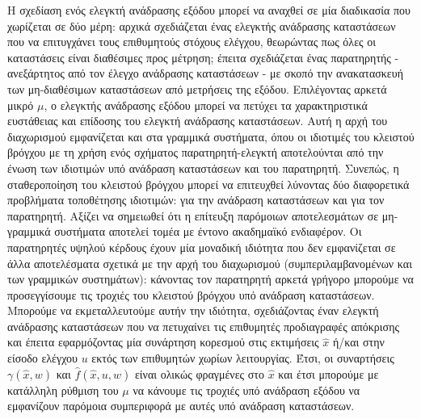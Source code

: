Η σχεδίαση ενός ελεγκτή ανάδρασης εξόδου μπορεί να αναχθεί σε μία διαδικασία που χωρίζεται σε δύο μέρη: αρχικά σχεδιάζεται ένας ελεγκτής ανάδρασης καταστάσεων που να επιτυγχάνει τους επιθυμητούς στόχους ελέγχου, θεωρώντας πως όλες οι καταστάσεις είναι διαθέσιμες προς μέτρηση; έπειτα σχεδιάζεται ένας παρατηρητής - ανεξάρτητος από τον έλεγχο ανάδρασης καταστάσεων - με σκοπό την ανακατασκευή των μη-διαθέσιμων καταστάσεων από μετρήσεις της εξόδου. Επιλέγοντας αρκετά μικρό $\mu$, ο ελεγκτής ανάδρασης εξόδου μπορεί να πετύχει τα χαρακτηριστικά ευστάθειας και επίδοσης του ελεγκτή ανάδρασης καταστάσεων. Αυτή η αρχή του διαχωρισμού εμφανίζεται και στα γραμμικά συστήματα, όπου οι ιδιοτιμές του κλειστού βρόγχου με τη χρήση ενός σχήματος παρατηρητή-ελεγκτή αποτελούνται από την ένωση των ιδιοτιμών υπό ανάδραση καταστάσεων και του παρατηρητή. Συνεπώς, η σταθεροποίηση του κλειστού βρόγχου μπορεί να επιτευχθεί λύνοντας δύο διαφορετικά προβλήματα τοποθέτησης ιδιοτιμών: για την ανάδραση καταστάσεων και για τον παρατηρητή. Αξίζει να σημειωθεί ότι η επίτευξη παρόμοιων αποτελεσμάτων σε μη-γραμμικά συστήματα αποτελεί τομέα με έντονο ακαδημαϊκό ενδιαφέρον. Οι παρατηρητές υψηλού κέρδους έχουν μία μοναδική ιδιότητα που δεν εμφανίζεται σε άλλα αποτελέσματα σχετικά με την αρχή του διαχωρισμού (συμπεριλαμβανομένων και των γραμμικών συστημάτων): κάνοντας τον παρατηρητή αρκετά γρήγορο μπορούμε να προσεγγίσουμε τις τροχιές του κλειστού βρόγχου υπό ανάδραση καταστάσεων. Μπορούμε να εκμεταλλευτούμε αυτήν την ιδιότητα, σχεδιάζοντας έναν ελεγκτή ανάδρασης καταστάσεων που να πετυχαίνει τις επιθυμητές προδιαγραφές απόκρισης και έπειτα εφαρμόζοντας μία συνάρτηση κορεσμού στις εκτιμήσεις $\hat x$ ή/και στην είσοδο ελέγχου $u$ εκτός των επιθυμητών χωρίων λειτουργίας. Έτσι, οι συναρτήσεις 
$\gamma(\hat x, w)$ και $\hat f(\hat x, u, w)$ είναι ολικώς φραγμένες στο $\hat x$ και έτσι μπορούμε με κατάλληλη ρύθμιση του $\mu$ να κάνουμε τις τροχιές υπό ανάδραση εξόδου να εμφανίζουν παρόμοια συμπεριφορά με αυτές υπό ανάδραση καταστάσεων.

